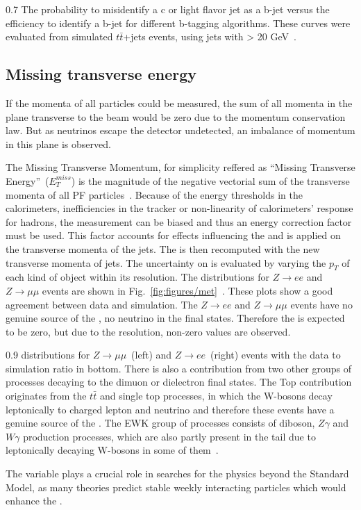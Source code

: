                  {0.7}       %
                 { The probability to misidentify a c or light flavor jet as a b-jet versus the efficiency to identify a b-jet for different b-tagging algorithms. These curves were evaluated from simulated $t\bar{t}$+jets events, using jets with \pt > 20 GeV~\cite{Sirunyan:2017ezt}. }


\subsection{Missing transverse energy~\label{sec:MET}}


If the momenta of all particles could be measured, the sum of all momenta in the plane transverse to the beam would be zero due to the momentum conservation law. But as neutrinos escape the detector undetected, an imbalance of momentum in this plane is observed. 

The Missing Transverse Momentum, for simplicity reffered as ``Missing Transverse Energy''~($E_{T}^{miss}$) is the magnitude of the negative vectorial sum of the transverse momenta of all PF particles~\cite{CMS:2016ljj}. Because of the energy thresholds in the calorimeters, inefficiencies in the tracker or non-linearity of calorimeters' response for hadrons, the \MET measurement can be biased and thus an energy correction factor must be used. This factor accounts for effects influencing the \MET and is applied on the transverse momenta of the jets. The \MET is then recomputed with the new transverse momenta of jets. The uncertainty on \MET is evaluated by varying the $p_{T}$ of each kind of object within its resolution. The  \MET  distributions for  $Z \rightarrow ee$ and $Z \rightarrow \mu \mu$ events are shown in Fig.~\ref{fig:figures/met}~\cite{CMS:2016ljj}. These plots show a good agreement between data and simulation. The $Z \rightarrow ee$ and $Z \rightarrow \mu \mu$ events have no genuine source of the \MET , no neutrino in the final states. Therefore the \MET is expected to be zero, but due to the \MET resolution, non-zero values are observed.  


                 {0.9}       %
                 { \MET distributions for $Z \rightarrow \mu \mu$~(left) and $Z \rightarrow ee$~(right) events with the data to simulation ratio in bottom. There is also a contribution from two other groups of processes decaying to the dimuon or dielectron final states. The Top contribution originates from the $t\bar{t}$ and single top processes, in which the W-bosons decay leptonically to charged lepton and neutrino and therefore these events have a genuine source of the \MET. The EWK group of processes consists of diboson, $Z\gamma$ and $W\gamma$ production processes, which are also partly present in the \MET tail due to leptonically decaying W-bosons in some of them~\cite{CMS:2016ljj}. }

The \MET variable plays a crucial role in searches for the physics beyond the Standard Model, as many theories predict stable weekly interacting particles which would enhance the \MET.



